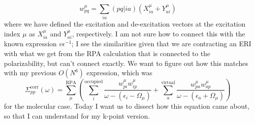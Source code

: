 \documentclass[12pt]{article}
\begin{document}
\begin{equation}
    w_{pq}^{\mu} = \sum_{ia} (pq|ia) \left(X_{ia}^{\mu} + Y_{ai}^{\mu}\right)
\end{equation}
where we have defined the excitation and de-excitation vectors at the excitation index $\mu$ as $X_{ia}^{\mu}$ and $Y_{ai}^{\mu}$, respectively.
I am not sure how to connect this with the known expression $v\epsilon ^{-1}$; I see the similarities given that we are contracting an ERI with what we get from the RPA calculation that is connected to the polarizability, but can't connect exactly.
We want to figure out how this matches with my previous $O(N^6)$ expression, which was
\begin{equation}
    \Sigma_{pp}^{\text{corr}}(\omega) = \sum_{\mu }^{\text{RPA}}\left(\sum_{i}^{\text{occupied}} \frac{w_{pi}^{\mu }w_{ip}^{\mu }}{\omega -(\epsilon _{i}-\Omega  _{\mu })}+ \sum_{a}^{\text{virtual}} \frac{w_{pa}^{\mu }w_{ap}^{\mu }}{\omega -(\epsilon _{a}+\Omega  _{\mu })}\right)
\end{equation}
for the molecular case. Today I want us to dissect how this equation came about, so that I can understand for my k-point version.
\end{document}
